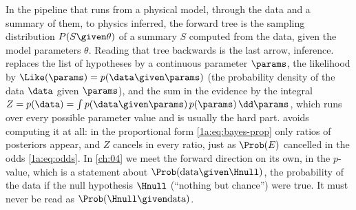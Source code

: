 In the pipeline that runs from a physical model, through the data and a summary
of them, to physics inferred, the forward tree is the sampling distribution
$P(S\given\theta)$ of a summary $S$ computed from the data, given the model
parameters $\theta$. Reading that tree backwards is the last arrow, inference.  replaces the list of hypotheses by a continuous
parameter $\params$, the likelihood by $\Like(\params)=p(\data\given\params)$ (the
probability density of the data $\data$ given $\params$), and the sum in the
evidence by the integral $Z=p(\data)=\int p(\data\given\params)\,p(\params)\,\dd\params$,
which runs over every possible parameter value and is usually the hard part.
 avoids computing it at all: in the proportional form
\eqref{1a:eq:bayes-prop} only ratios of posteriors appear, and $Z$ cancels in
every ratio, just as $\Prob(E)$ cancelled in the odds \eqref{1a:eq:odds}. In
\cref{ch:04} we meet the forward direction on its own, in the $p$-value, which
is a statement about $\Prob(\text{data}\given\Hnull)$, the probability of the data
if the null hypothesis $\Hnull$ (``nothing but chance'') were true. It must
never be read as $\Prob(\Hnull\given\text{data})$.

